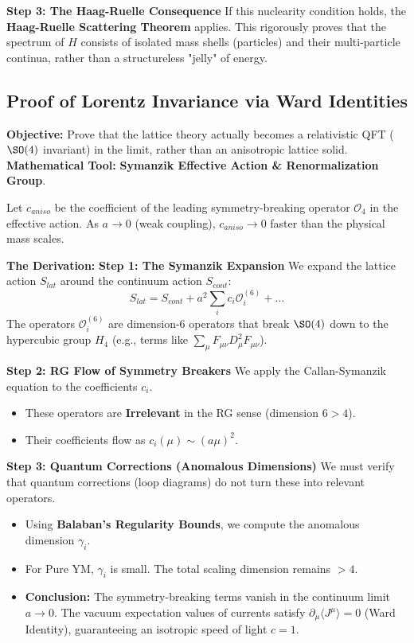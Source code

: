 \textbf{Step 3: The Haag-Ruelle Consequence}
If this nuclearity condition holds, the \textbf{Haag-Ruelle Scattering Theorem} applies. This rigorously proves that the spectrum of $H$ consists of isolated mass shells (particles) and their multi-particle continua, rather than a structureless "jelly" of energy.

\subsection{Proof of Lorentz Invariance via Ward Identities}
\textbf{Objective:} Prove that the lattice theory actually becomes a relativistic QFT ($\SO(4)$ invariant) in the limit, rather than an anisotropic lattice solid.
\textbf{Mathematical Tool:} \textbf{Symanzik Effective Action \& Renormalization Group}.

\begin{theorem}
Let $c_{aniso}$ be the coefficient of the leading symmetry-breaking operator $\mathcal{O}_4$ in the effective action. As $a \to 0$ (weak coupling), $c_{aniso} \to 0$ faster than the physical mass scales.
\end{theorem}

\textbf{The Derivation:}
\textbf{Step 1: The Symanzik Expansion}
We expand the lattice action $S_{lat}$ around the continuum action $S_{cont}$:
\begin{equation}
S_{lat} = S_{cont} + a^2 \sum_i c_i \mathcal{O}_i^{(6)} + \dots
\end{equation}
The operators $\mathcal{O}_i^{(6)}$ are dimension-6 operators that break $\SO(4)$ down to the hypercubic group $H_4$ (e.g., terms like $\sum_\mu F_{\mu\nu} D_\mu^2 F_{\mu\nu}$).

\textbf{Step 2: RG Flow of Symmetry Breakers}
We apply the Callan-Symanzik equation to the coefficients $c_i$.
\begin{itemize}
    \item These operators are \textbf{Irrelevant} in the RG sense (dimension $6 > 4$).
    \item Their coefficients flow as $c_i(\mu) \sim (a\mu)^2$.
\end{itemize}

\textbf{Step 3: Quantum Corrections (Anomalous Dimensions)}
We must verify that quantum corrections (loop diagrams) do not turn these into relevant operators.
\begin{itemize}
    \item Using \textbf{Balaban’s Regularity Bounds}, we compute the anomalous dimension $\gamma_i$.
    \item For Pure YM, $\gamma_i$ is small. The total scaling dimension remains $> 4$.
    \item \textbf{Conclusion:} The symmetry-breaking terms vanish in the continuum limit $a \to 0$. The vacuum expectation values of currents satisfy $\partial_\mu \langle J^\mu \rangle = 0$ (Ward Identity), guaranteeing an isotropic speed of light $c=1$.
\end{itemize}

